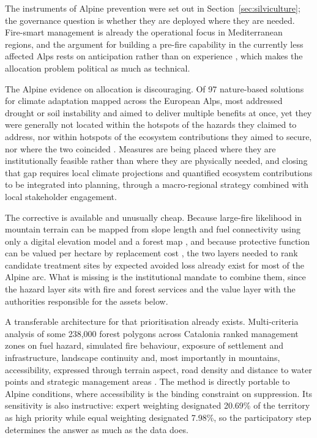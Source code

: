 \documentclass[11pt,a4paper]{article}
\begin{document}
The instruments of Alpine prevention were set out in Section~\ref{sec:silviculture}; the governance question is whether they are deployed where they are needed. Fire-smart management is already the operational focus in Mediterranean regions, and the argument for building a pre-fire capability in the currently less affected Alps rests on anticipation rather than on experience \citep{gerberding_mapping_2025}, which makes the allocation problem political as much as technical.

The Alpine evidence on allocation is discouraging. Of 97 nature-based solutions for climate adaptation mapped across the European Alps, most addressed drought or soil instability and aimed to deliver multiple benefits at once, yet they were generally not located within the hotspots of the hazards they claimed to address, nor within hotspots of the ecosystem contributions they aimed to secure, nor where the two coincided \citep{dubo_nature-based_2023}. Measures are being placed where they are institutionally feasible rather than where they are physically needed, and closing that gap requires local climate projections and quantified ecosystem contributions to be integrated into planning, through a macro-regional strategy combined with local stakeholder engagement.

The corrective is available and unusually cheap. Because large-fire likelihood in mountain terrain can be mapped from slope length and fuel connectivity using only a digital elevation model and a forest map \citep{conedera_linking_2024}, and because protective function can be valued per hectare by replacement cost \citep{accastello_asforesee_2019}, the two layers needed to rank candidate treatment sites by expected avoided loss already exist for most of the Alpine arc. What is missing is the institutional mandate to combine them, since the hazard layer sits with fire and forest services and the value layer with the authorities responsible for the assets below.

A transferable architecture for that prioritisation already exists. Multi-criteria analysis of some 238{,}000 forest polygons across Catalonia ranked management zones on fuel hazard, simulated fire behaviour, exposure of settlement and infrastructure, landscape continuity and, most importantly in mountains, accessibility, expressed through terrain aspect, road density and distance to water points and strategic management areas \citep{krsnik_spatial_2024}. The method is directly portable to Alpine conditions, where accessibility is the binding constraint on suppression. Its sensitivity is also instructive: expert weighting designated 20.69\% of the territory as high priority while equal weighting designated 7.98\%, so the participatory step determines the answer as much as the data does.
\end{document}
